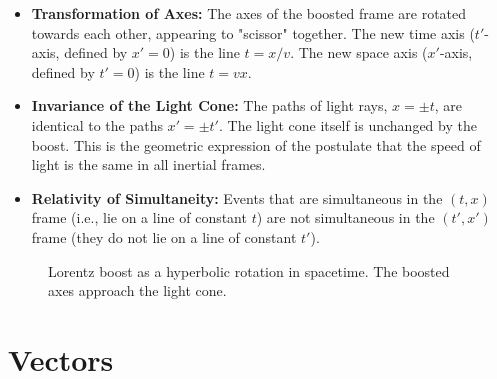 \documentclass[11pt, a4paper]{report}
\begin{document}
\begin{itemize}
    \item \textbf{Transformation of Axes:} The axes of the boosted frame are rotated towards each other, appearing to "scissor" together. The new time axis ($t'$-axis, defined by $x'=0$) is the line $t = x/v$. The new space axis ($x'$-axis, defined by $t'=0$) is the line $t = vx$.
    \item \textbf{Invariance of the Light Cone:} The paths of light rays, $x = \pm t$, are identical to the paths $x' = \pm t'$. The light cone itself is unchanged by the boost. This is the geometric expression of the postulate that the speed of light is the same in all inertial frames.
    \item \textbf{Relativity of Simultaneity:} Events that are simultaneous in the $(t,x)$ frame (i.e., lie on a line of constant $t$) are not simultaneous in the $(t', x')$ frame (they do not lie on a line of constant $t'$).
\end{itemize}

\begin{figure}[h]
\centering
{}
\caption{Lorentz boost as a hyperbolic rotation in spacetime. The boosted axes approach the light cone.}
\end{figure}

\section{Vectors}
\end{document}
